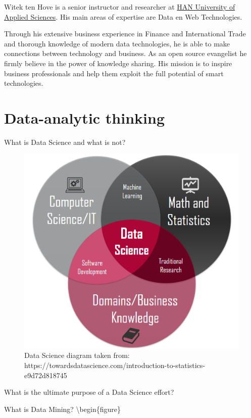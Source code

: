 \documentclass[
]{book}
\begin{document}
Witek ten Hove is a senior instructor and researcher at \href{https://hanuniversity.com/en/}{HAN University of Applied Sciences}. His main areas of expertise are Data en Web Technologies.

Through his extensive business experience in Finance and International Trade and thorough knowledge of modern data technologies, he is able to make connections between technology and business. As an open source evangelist he firmly believe in the power of knowledge sharing. His mission is to inspire business professionals and help them exploit the full potential of smart technologies.

\hypertarget{thinking}{%
\chapter{Data-analytic thinking}\label{thinking}}

What is Data Science and what is not?

\begin{figure}

{\centering \includegraphics[width=0.8\linewidth]{images/datascience} 

}

\caption{Data Science diagram taken from: https://towardsdatascience.com/introduction-to-statistics-e9d72d818745}\label{fig:datascience-fig}
\end{figure}

What is the ultimate purpose of a Data Science effort?

What is Data Mining?
\textbackslash begin\{figure\}
\end{document}
